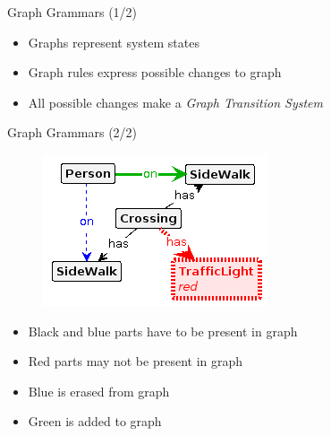 \documentclass{FMTslides}
\begin{document}
\begin{frame}{Graph Grammars (1/2)}
\begin{figure}
\centering
\end{figure}

\begin{itemize}[<+->]
  \item Graphs represent system states
  \item Graph rules express possible changes to graph
  \item All possible changes make a \textit{Graph Transition System}
\end{itemize}
\end{frame}

\begin{frame}{Graph Grammars (2/2)}
\begin{figure}
\includegraphics[scale=0.75]{./figures/cross.png}
\end{figure}
\begin{itemize}[<+->]
  \item Black and blue parts have to be present in graph
  \item Red parts may not be present in graph
  \item Blue is erased from graph
  \item Green is added to graph
\end{itemize}
\end{frame}
\end{document}
